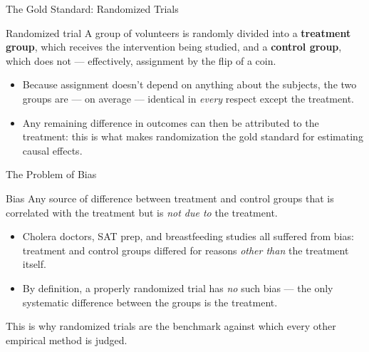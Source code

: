 \documentclass[11pt,aspectratio=169]{beamer}
\begin{document}
\begin{frame}{The Gold Standard: Randomized Trials}
  \begin{block}{Randomized trial}
    A group of volunteers is randomly divided into a \textbf{treatment group}, which receives the intervention being studied, and a \textbf{control group}, which does not --- effectively, assignment by the flip of a coin.
  \end{block}
  \vspace{0.5em}
  \begin{itemize}
    \item Because assignment doesn't depend on anything about the subjects, the two groups are --- on average --- identical in \emph{every} respect except the treatment.
    \item Any remaining difference in outcomes can then be attributed to the treatment: this is what makes randomization the gold standard for estimating causal effects.
  \end{itemize}
\end{frame}

\begin{frame}{The Problem of Bias}
  \begin{block}{Bias}
    Any source of difference between treatment and control groups that is correlated with the treatment but is \emph{not due to} the treatment.
  \end{block}
  \vspace{0.3em}
  \begin{itemize}
    \item Cholera doctors, SAT prep, and breastfeeding studies all suffered from bias: treatment and control groups differed for reasons \emph{other than} the treatment itself.
    \item By definition, a properly randomized trial has \emph{no} such bias --- the only systematic difference between the groups is the treatment.
  \end{itemize}
  \vspace{0.3em}
  \centering
  \alert{This is why randomized trials are the benchmark against which every other empirical method is judged.}
\end{frame}

 
\end{document}
